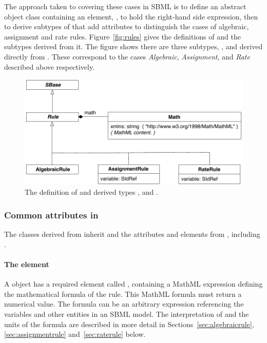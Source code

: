 The approach taken to covering these cases in SBML is to define an
abstract \Rule object class containing an element,
, to hold the right-hand side expression, then to
derive subtypes of \Rule that add attributes to
distinguish the cases of algebraic, assignment and rate rules.
Figure~\vref{fig:rules} gives the definitions of \Rule and the
subtypes derived from it.  The figure shows there are three
subtypes, \AlgebraicRule, \AssignmentRule and \RateRule derived
directly from \Rule. These correspond to the cases
\emph{Algebraic}, \emph{Assignment}, and \emph{Rate} described
above respectively.

\begin{figure}[htb]
  \centering
  \vspace*{4ex}
  \includegraphics[scale=0.8]{figs/rule-uml}
  \caption{The definition of \Rule and derived types
      \AlgebraicRule, \AssignmentRule and \RateRule.}
  \label{fig:rules}
\vspace*{3ex}
\end{figure}



\subsubsection{Common attributes in }
\label{sec:rule-math}\label{sec:rule-fields}\label{sec:rule-sboterm}

The classes derived from \Rule inherit  and
  the attributes and elements from \SBase, including
.


\paragraph{The  element}

A \Rule object has a required element called ,
containing a MathML expression defining the mathematical formula
of the rule.  This MathML formula must return a numerical value.
The formula can be an arbitrary expression referencing the
variables and other entities in an SBML model.  The interpretation
of  and the units of the formula are described in more
detail in Sections~\ref{sec:algebraicrule},
\ref{sec:assignmentrule} and~\ref{sec:raterule} below.


